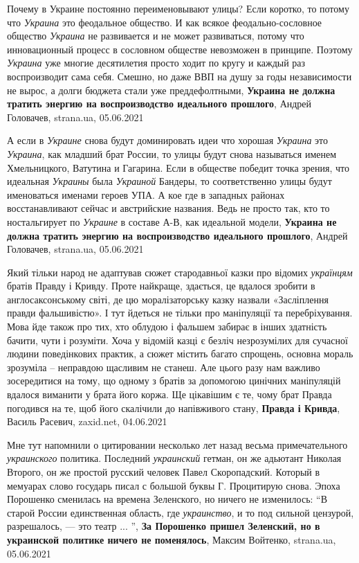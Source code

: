 Почему в Украине постоянно переименовывают улицы?  Если коротко, то потому что
\emph{Украина} это феодальное общество. И как всякое феодально-сословное
общество \emph{Украина} не развивается и не может развиваться, потому что
инновационный процесс в сословном обществе невозможен в принципе. Поэтому
\emph{Украина} уже многие десятилетия просто ходит по кругу и каждый раз
воспроизводит сама себя. Смешно, но даже ВВП на душу за годы независимости не
вырос, а долги бюджета стали уже преддефолтными,
\textbf{Украина не должна тратить энергию на воспроизводство идеального прошлого},
Андрей Головачев, strana.ua, 05.06.2021

А если в \emph{Украине} снова будут доминировать идеи что хорошая
\emph{Украина} это \emph{Украина}, как младший брат России, то улицы будут
снова называться именем Хмельницкого, Ватутина и Гагарина. Если в обществе
победит точка зрения, что идеальная \emph{Украины} была \emph{Украиной}
Бандеры, то соответственно улицы будут именоваться именами героев УПА. А кое
где в западных районах восстанавливают сейчас и австрийские названия. Ведь не
просто так, кто то ностальгирует по \emph{Украине} в составе А-В, как идеальной
модели, \textbf{Украина не должна тратить энергию на воспроизводство идеального
прошлого}, Андрей Головачев, strana.ua, 05.06.2021

Який тільки народ не адаптував сюжет стародавньої казки про відомих \emph{українцям}
братів Правду і Кривду. Проте найкраще, здається, це вдалося зробити в
англосаксонському світі, де цю моралізаторську казку назвали «Засліплення
правди фальшивістю». І тут йдеться не тільки про маніпуляції та перебріхування.
Мова йде також про тих, хто облудою і фальшем забирає в інших здатність бачити,
чути і розуміти. Хоча у відомій казці є безліч незрозумілих для сучасної людини
поведінкових практик, а сюжет містить багато спрощень, основна мораль зрозуміла
– неправдою щасливим не станеш. Але цього разу нам важливо зосередитися на
тому, що одному з братів за допомогою цинічних маніпуляцій вдалося виманити у
брата його коржа. Ще цікавішим є те, чому брат Правда погодився на те, щоб його
скалічили до напівживого стану,
\textbf{Правда і Кривда}, Василь Расевич, zaxid.net, 04.06.2021

Мне тут напомнили о цитировании несколько лет назад весьма примечательного
\emph{украинского} политика. Последний \emph{украинский} гетман, он же адьютант Николая
Второго, он же простой русский человек Павел Скоропадский. Который в мемуарах
слово государь писал с большой буквы Г.  Процитирую снова. Эпоха Порошенко
сменилась на времена Зеленского, но ничего не изменилось: \enquote{В старой России
единственная область, где \emph{украинство}, и то под сильной цензурой, разрешалось, —
это театр ... }, 
\textbf{За Порошенко пришел Зеленский, но в украинской политике ничего не поменялось}, Максим Войтенко, strana.ua, 05.06.2021

